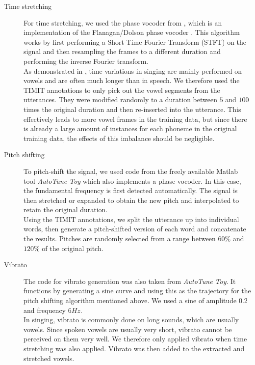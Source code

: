\begin{description}
 \item[Time stretching] For time stretching, we used the phase vocoder from \cite{ellis_pvoc}, which is an implementation of the Flanagan/Dolson phase vocoder \cite{flanagan}\cite{dolson}. This algorithm works by first performing a Short-Time Fourier Transform (STFT) on the signal and then resampling the frames to a different duration and performing the inverse Fourier transform.\\
 As demonstrated in \cite{kruspe_kws1}, time variations in singing are mainly performed on vowels and are often much longer than in speech. We therefore used the TIMIT annotations to only pick out the vowel segments from the utterances. They were modified randomly to a duration between $5$ and $100$ times the original duration and then re-inserted into the utterance. This effectively leads to more vowel frames in the training data, but since there is already a large amount of instances for each phoneme in the original training data, the effects of this imbalance should be negligible. 
 \item[Pitch shifting] To pitch-shift the signal, we used code from the freely available Matlab tool \textit{AutoTune Toy}\cite{autotunetoy} which also implements a phase vocoder. In this case, the fundamental frequency is first detected automatically. The signal is then stretched or expanded to obtain the new pitch and interpolated to retain the original duration.\\
 Using the TIMIT annotations, we split the utterance up into individual words, then generate a pitch-shifted version of each word and concatenate the results. Pitches are randomly selected from a range between $60\%$ and $120\%$ of the original pitch.
 \item[Vibrato] The code for vibrato generation was also taken from \textit{AutoTune Toy}. It functions by generating a sine curve and using this as the trajectory for the pitch shifting algorithm mentioned above. We used a sine of amplitude $0.2$ and frequency $6 Hz$.\\
 In singing, vibrato is commonly done on long sounds, which are usually vowels. Since spoken vowels are usually very short, vibrato cannot be perceived on them very well. We therefore only applied vibrato when time stretching was also applied. Vibrato was then added to the extracted and stretched vowels.
\end{description}



